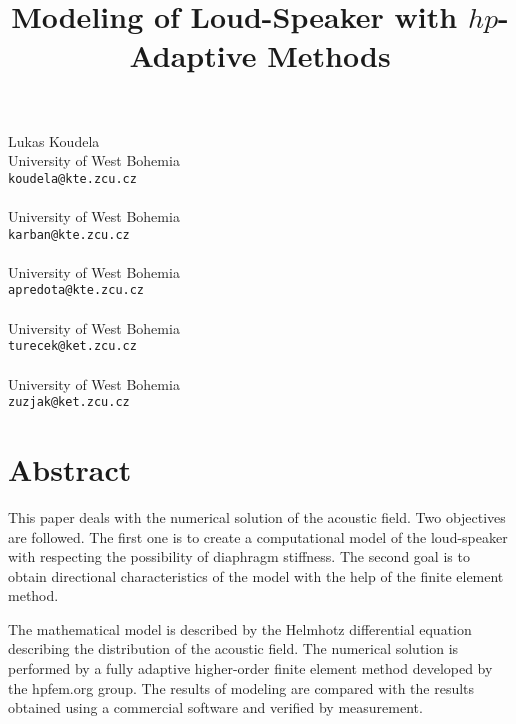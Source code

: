 \title{Modeling of Loud-Speaker with $hp$-Adaptive Methods}
 \author{} \institute{}
\maketitle
\begin{center}
{\large Lukas Koudela}\\
University of West Bohemia\\
{\tt koudela@kte.zcu.cz}
\\ \vspace{4mm}{\large Pavel Karban}\\
University of West Bohemia\\
{\tt karban@kte.zcu.cz}
\\ \vspace{4mm}{\large Antonin Predota}\\
University of West Bohemia\\
{\tt apredota@kte.zcu.cz}
\\ \vspace{4mm}{\large Oldrich Turecek}\\
University of West Bohemia\\
{\tt turecek@ket.zcu.cz}
\\ \vspace{4mm}{\large Ladislav Zuzjak}\\
University of West Bohemia\\
{\tt zuzjak@ket.zcu.cz}

\end{center}

\section*{Abstract}

This paper deals with the numerical solution of the acoustic field. Two objectives are followed. The first one is to create a computational model of the loud-speaker with respecting the possibility of diaphragm stiffness. \cite{1kk} The second goal is to obtain directional characteristics of the model with the help of the finite element method. \cite{3kk}

The mathematical model is described by the Helmhotz differential equation describing
the distribution of the acoustic field. The numerical solution is performed by a fully adaptive higher-order finite element method developed by the hpfem.org group. \cite{2kk} The results of modeling are compared with the results obtained using a commercial software and verified by measurement.

